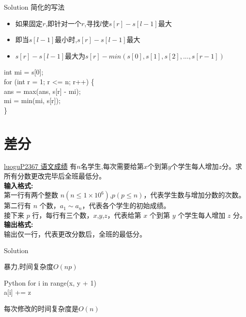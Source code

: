 \documentclass[aspectratio=169,xcolor=dvipsnames]{beamer}
\begin{document}
\begin{frame}{Solution}
    简化的写法
    \begin{itemize}
        \item 如果固定$r$,即针对一个$r$,寻找$l$使$s[r]-s[l-1]$最大\\
        \item 即当$s[l-1]$最小时,$s[r]-s[l-1]$最大\\
        \item $s[r]-s[l-1]$最大为$s[r]-min(s[0],s[1],s[2],...,s[r-1])$
    \end{itemize}


    \begin{block}{}
        int mi = s[0];\\
        for (int r = 1; r <= n; r++) \{\\
        \qquad ans = max(ans, s[r] - mi);\\
        \qquad mi = min(mi, s[r]);\\
        \}
    \end{block}

\end{frame}



\section{差分}
\begin{frame}{\href{https://www.luogu.com.cn/problem/P2367}{luoguP2367 语文成绩}}
    有$n$名学生,每次需要给第$x$个到第$y$个学生每人增加$z$分。求所有分数更改完毕后全班最低分。\\
    \textbf{输入格式:}\\
    第一行有两个整数 $n (n \le 1 \times 10^6)$,$p(p \le n)$，代表学生数与增加分数的次数。\\
    第二行有 $n$ 个数，$a_1 \sim a_n$，代表各个学生的初始成绩。\\
    接下来 $p$ 行，每行有三个数，$x$,$y$,$z$，代表给第 $x$ 个到第 $y$ 个学生每人增加 $z$ 分。\\
    \textbf{输出格式:}\\
    输出仅一行，代表更改分数后，全班的最低分。
\end{frame}

\begin{frame}{Solution}

    暴力,时间复杂度$O(np)$\\
    \begin{block}{Python}
        for i in range(x, y + 1)\\
        \quad a[i] += z
    \end{block}
    每次修改的时间复杂度是$O(n)$

\end{frame}
\end{document}
